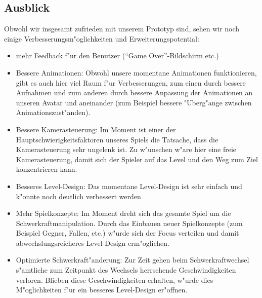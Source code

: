 \subsection{Ausblick}
\label{sec:results/future}
%
Obwohl wir insgesamt zufrieden mit unserem Prototyp sind, sehen wir noch einige
Verbesserungsm"oglichkeiten und Erweiterungspotential:

\begin{itemize}
	\item
		mehr Feedback f"ur den Benutzer (``Game Over''-Bildschirm etc.)
	\item Bessere Animationen: Obwohl unsere momentane Animationen funktionieren, gibt es auch hier viel
		Raum f"ur Verbesserungen, zum einen durch bessere Aufnahmen und zum anderen durch bessere Anpassung
		der Animationen an unseren Avatar und aneinander (zum Beispiel bessere "Uberg"ange zwischen
		Animationszust"anden).
	\item Bessere Kamerasteuerung: Im Moment ist einer der Hauptschwierigkeitsfaktoren unseres Spiels die
		Tatsache, dass die Kamerasteuerung sehr ungelenk ist. Zu w"unschen w"are hier eine freie Kamerasteuerung,
		damit sich der Spieler auf das Level und den Weg zum Ziel konzentrieren kann.
	\item Besseres Level-Design: Das momentane Level-Design ist sehr einfach und k"onnte noch deutlich
		verbessert werden
	\item Mehr Spielkonzepte: Im Moment dreht sich das gesamte Spiel um die Schwerkraftmanipulation.
		Durch das Einbauen neuer Spielkonzepte (zum Beispiel Gegner, Fallen, etc.) w"urde sich der Focus
		verteilen und damit abwechslungsreicheres Level-Design erm"oglichen.
	\item Optimierte Schwerkraft"anderung: Zur Zeit gehen beim Schwerkraftwechsel s"amtliche zum Zeitpunkt
		des Wechsels herrschende Geschwindigkeiten verloren. Blieben diese Geschwindigkeiten erhalten,
		w"urde dies M"oglichkeiten f"ur ein besseres Level-Design er"offnen.
\end{itemize}

